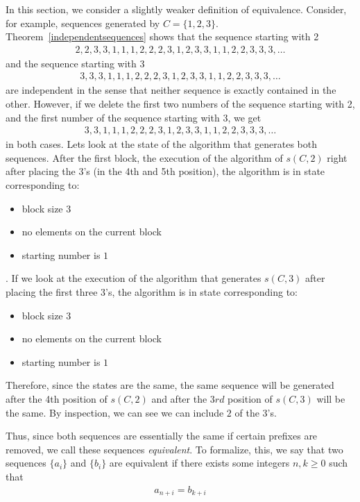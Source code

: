 \documentclass[runningheads,a4paper]{llncs}
\begin{document}
In this section, we consider a slightly weaker definition of equivalence. Consider, for example, sequences generated by $C = \{1,2,3\}$. Theorem~\ref{independentsequences} shows that the sequence starting with 2
\begin{align*}
2,2,3,3,1,1,1,2,2,2,3,1,2,3,3,1,1,2,2,3,3,3,\dots
\end{align*}
and the sequence starting with 3
\begin{align*}
3,3,3,1,1,1,2,2,2,3,1,2,3,3,1,1,2,2,3,3,3,\dots
\end{align*}
are independent in the sense that neither sequence is exactly contained in the other. However, if we delete the first two numbers of the sequence starting with 2, and the first number of the sequence starting with 3, we get 
\begin{align*}
3,3,1,1,1,2,2,2,3,1,2,3,3,1,1,2,2,3,3,3,\dots
\end{align*}
in both cases. Lets look at the state of the algorithm that generates both sequences. After the first block, the execution of the algorithm of $s(C, 2)$ right after placing the $3$'s (in the 4th and 5th position), the algorithm is in state corresponding to:
\begin{itemize}
\item block size $3$
\item no elements on the current block
\item starting number is $1$
\end{itemize}.   
If we look at the execution of the algorithm that generates $s(C, 3)$ after placing the first three $3$'s, the algorithm is in state corresponding to:
\begin{itemize}
\item block size $3$
\item no elements on the current block
\item starting number is $1$
\end{itemize}
Therefore, since the states are the same, the same sequence will be generated after the 4th position of $s(C, 2)$ and after the $3rd$ position of $s(C, 3)$ will be the same. By inspection, we can see we can include $2$ of the 3's.

Thus, since both sequences are essentially the same if certain prefixes are removed, we call these sequences \emph{equivalent}. To formalize, this, we say that two sequences $\{a_i\}$ and $\{b_i\}$ are equivalent if there exists some integers $n,k \geq 0$ such that
\begin{align*}
a_{n+i} = b_{k+i}
\end{align*}
\end{document}
